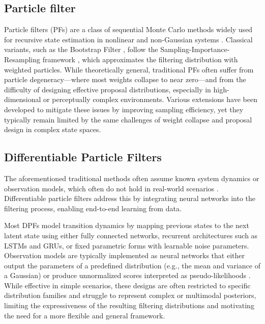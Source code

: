 \subsection{Particle filter}
Particle filters (PFs) are a class of sequential Monte Carlo methods widely used for recursive state estimation in nonlinear and non-Gaussian systems \cite{djuric2003particle}. Classical variants, such as the Bootstrap Filter \cite{gordon1993novel}, follow the Sampling-Importance-Resampling framework \cite{godsill2019particle}, which approximates the filtering distribution with weighted particles. While theoretically general, traditional PFs often suffer from particle degeneracy—where most weights collapse to near zero—and from the difficulty of designing effective proposal distributions, especially in high-dimensional or perceptually complex environments. Various extensions \cite{godsill2019particle} have been developed to mitigate these issues by improving sampling efficiency, yet they typically remain limited by the same challenges of weight collapse and proposal design in complex state spaces.

\subsection{Differentiable Particle Filters}
The aforementioned traditional methods often assume known system dynamics or observation models, which often do not hold in real-world scenarios \cite{chen2024normalizing}. Differentiable particle filters \cite{chen2023overview, jonschkowski2018differentiable, karkus2018particle, corenflos2021differentiable, scibior2021differentiable, rosato2022efficient, kloss2021train, ma2020particle} address this by integrating neural networks into the filtering process, enabling end-to-end learning from data.

Most DPFs model transition dynamics by mapping previous states to the next latent state using either fully connected networks\cite{jonschkowski2018differentiable, karkus2018particle}, recurrent architectures such as LSTMs and GRUs\cite{scibior2021differentiable, ma2020particle}, or fixed parametric forms with learnable noise parameters\cite{kloss2021train}. 
Observation models are typically implemented as neural networks that either output the parameters of a predefined distribution (e.g., the mean and variance of a Gaussian) \cite{ma2020particle} or produce unnormalized scores interpreted as pseudo-likelihoods \cite{corenflos2021differentiable}. 
While effective in simple scenarios, these designs are often restricted to specific distribution families and struggle to represent complex or multimodal posteriors, limiting the expressiveness of the resulting filtering distributions and motivating the need for a more flexible and general framework.

